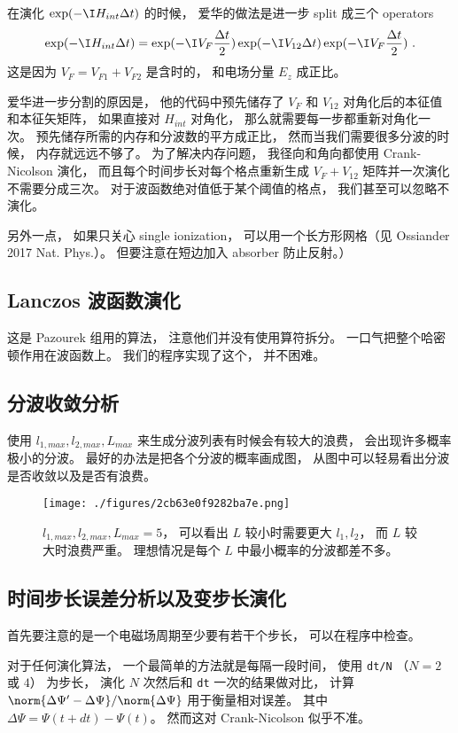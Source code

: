 在演化 $\exp(-\I H_{int}\Delta t)$ 的时候， 爱华的做法是进一步 split 成三个 operators
\begin{equation}\label{eq_HeTDSE_4}
\exp(-\I H_{int}\Delta t) = \exp(-\I V_F\frac{\Delta t}{2})   \exp(-\I V_{12} \Delta t) \exp(-\I V_F\frac{\Delta t}{2})~.
\end{equation}
这是因为 $V_F = V_{F1} + V_{F2}$ 是含时的， 和电场分量 $E_z$ 成正比。

爱华进一步分割的原因是， 他的代码中预先储存了 $V_F$ 和 $V_{12}$ 对角化后的本征值和本征矢矩阵， 如果直接对 $H_{int}$ 对角化， 那么就需要每一步都重新对角化一次。 预先储存所需的内存和分波数的平方成正比， 然而当我们需要很多分波的时候， 内存就远远不够了。 为了解决内存问题， 我径向和角向都使用 Crank-Nicolson 演化， 而且每个时间步长对每个格点重新生成 $V_F + V_{12}$ 矩阵并一次演化不需要分成三次。 对于波函数绝对值低于某个阈值的格点， 我们甚至可以忽略不演化。

另外一点， 如果只关心 single ionization， 可以用一个长方形网格（见 Ossiander 2017 Nat. Phys.）。 但要注意在短边加入 absorber 防止反射。）

\subsection{Lanczos 波函数演化}
这是 Pazourek 组用的算法， 注意他们并没有使用算符拆分。 一口气把整个哈密顿作用在波函数上。 我们的程序实现了这个， 并不困难。

\subsection{分波收敛分析}
使用 $l_{1,max}, l_{2,max}, L_{max}$ 来生成分波列表有时候会有较大的浪费， 会出现许多概率极小的分波。 最好的办法是把各个分波的概率画成图， 从图中可以轻易看出分波是否收敛以及是否有浪费。
\begin{figure}[ht]
\centering
\texttt{[image: ./figures/2cb63e0f9282ba7e.png]}
\caption{$l_{1,max}, l_{2,max}, L_{max} = 5$， 可以看出 $L$ 较小时需要更大 $l_1, l_2$， 而 $L$ 较大时浪费严重。 理想情况是每个 $L$ 中最小概率的分波都差不多。} \label{fig_HeTDSE_2}
\end{figure}

\subsection{时间步长误差分析以及变步长演化}
首先要注意的是一个电磁场周期至少要有若干个步长， 可以在程序中检查。

对于任何演化算法， 一个最简单的方法就是每隔一段时间， 使用 \verb|dt/N| （$N = 2$ 或 $4$） 为步长， 演化 $N$ 次然后和 \verb|dt| 一次的结果做对比， 计算 $\norm{\Delta \Psi' - \Delta \Psi}/\norm{\Delta \Psi}$ 用于衡量相对误差。 其中 $\Delta\Psi = \Psi(t+dt) - \Psi(t)$。 然而这对 Crank-Nicolson 似乎不准。

